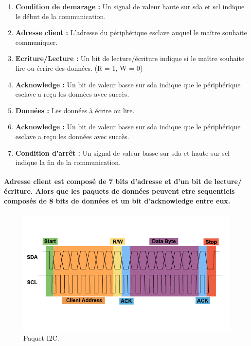 \begin{enumerate}
	\item \textbf{Condition de demarage :} Un signal de valeur haute sur \acrshort{sda} et \acrshort{scl} indique le début de la communication.
	\item \textbf{Adresse client :} L'adresse du périphérique esclave auquel le maître souhaite communiquer.
	\item \textbf{Ecriture/Lecture :} Un bit de lecture/écriture indique si le maître souhaite lire ou écrire des données. (R = 1, W = 0)
	\item \textbf{Acknowledge :} Un bit de valeur basse sur \acrshort{sda} indique que le périphérique esclave a reçu les données avec succès.
	\item \textbf{Données :} Les données à écrire ou lire.
	\item \textbf{Acknowledge :} Un bit de valeur basse sur \acrshort{sda} indique que le périphérique esclave a reçu les données avec succès.
	\item \textbf{Condition d'arrêt :} Un signal de valeur basse sur \acrshort{sda} et haute sur \acrshort{scl} indique la fin de la communication.
\end{enumerate}

\paragraph*{\textbf{Adresse client} est composé de 7 bits d'adresse et d'un bit de lecture/écriture. Alors que \textbf{les paquets de données} peuvent etre sequentiels composés de 8 bits de données et un bit d'acknowledge entre eux.}

\begin{figure}[!htpb]
	\centering
	\includegraphics[width=\linewidth]{Figures/i2c-packet.png}
	\caption[Paquet I2C]{Paquet I2C.}
	\label{fig:i2c-packet}
\end{figure}

